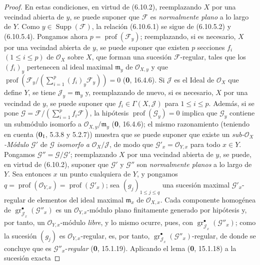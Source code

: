 \begin{proof}
En estas condiciones, en virtud de (6.10.2), reemplazando $X$ por una
vecindad abierta de $y$, se puede suponer que $\mathcal F$ es \emph{normalmente plano} a lo
largo de $Y$. Como $y\in\operatorname{Supp}(\mathcal F)$, la relación
(6.10.6.1) se sigue de (6.10.5.2) y (6.10.5.4). Pongamos ahora
$p=\operatorname{prof}(\mathcal F_y)$; reemplazando, si es necesario, $X$ por una
vecindad abierta de $y$, se puede suponer que existen $p$ secciones $f_i$
$(1\leq i\leq p)$ de $\mathcal O_X$ sobre $X$, que forman una sucesión
$\mathcal F$-regular, tales que los $(f_i)_y$ pertenecen al ideal
maximal $\mathfrak m_y$ de $\mathcal O_{X,y}$ y que
$\operatorname{prof}(\mathcal F_y/(\sum_{i=1}^{p}(f_i)_y\mathcal F_y))=0$
(\textbf 0, 16.4.6). Si $\mathcal J$ es el Ideal de $\mathcal O_X$ que define
$Y$, se tiene $\mathcal J_y=\mathfrak m_y$ y, reemplazando de nuevo, si es necesario, $X$
por una vecindad de $y$, se puede suponer que
$f_i\in\Gamma(X,\mathcal J)$ para $1\leq i\leq p$. Además, si se pone
$\mathcal G=\mathcal F/(\sum_{i=1}^{p}f_i\mathcal F)$, la hipótesis
$\operatorname{prof}(\mathcal G_y)=0$ implica que $\mathcal G_y$ contiene
un submódulo isomorfo a
$\mathcal O_{X,y}/\mathfrak m_y$ (\textbf 0, 16.4.6); el mismo razonamiento (teniendo
en cuenta (\textbf{0}$_{\rm I}$, 5.3.8 y 5.2.7)) muestra que se puede suponer que
existe un \emph{sub-$\mathcal O_X$-Módulo} $\mathcal G'$ de $\mathcal G$
\emph{isomorfo a} $\mathcal O_X/\mathcal J$, de modo que
$\mathcal G'_x=\mathcal O_{Y,x}$ para todo $x\in Y$. Pongamos
$\mathcal G''=\mathcal G/\mathcal G'$; reemplazando $X$ por una vecindad
abierta de $y$, se puede, en virtud de (6.10.2), suponer que $\mathcal G'$ y
$\mathcal G''$ son \emph{normalmente planos} a lo largo de $Y$. Sea entonces $x$ un
punto cualquiera de $Y$, y pongamos
$q=\operatorname{prof}(\mathcal O_{Y,x})=\operatorname{prof}(\mathcal G'_x)$;
sea $(g_j)_{1\leq j\leq q}$ una sucesión maximal
$\mathcal G'_x$-regular de elementos del ideal maximal
$\mathfrak m_x$ de $\mathcal O_{X,x}$. Cada componente homogénea de
$\operatorname{gr}_{\mathcal J_x}^{\bullet}(\mathcal G''_x)$ es un
$\mathcal O_{Y,x}$-módulo plano finitamente generado por hipótesis y, por tanto, un
$\mathcal O_{Y,x}$-módulo \emph{libre}, y lo mismo ocurre, pues, con
$\operatorname{gr}_{\mathcal J_x}^{\bullet}(\mathcal G''_x)$; como la
sucesión $(g_j)$ es $\mathcal O_{Y,x}$-regular, es, por tanto,
$\operatorname{gr}_{\mathcal J_x}^{\bullet}(\mathcal G''_x)$-regular,
de donde se concluye que es $\mathcal G''_x$-\emph{regular} (\textbf 0, 15.1.19).
Aplicando el lema (\textbf 0, 15.1.18) a la sucesión exacta

\end{proof}
